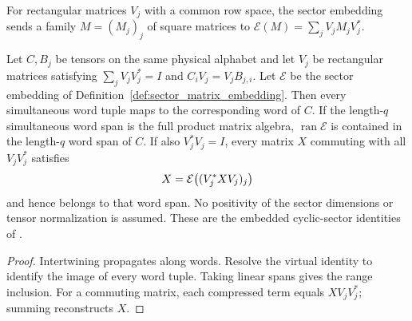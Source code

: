 \begin{definition}
    \label{def:sector_matrix_embedding}
    \leanok
    For rectangular matrices $V_j$ with a common row space, the sector
    embedding sends a family $M=(M_j)_j$ of square matrices to
    $\mathcal E(M)=\sum_jV_jM_jV_j^*$.
\end{definition}

\begin{lemma}
    \label{thm:embedded_sector_word_span}
    \leanok
    Let $C,B_j$ be tensors on the same physical alphabet and let
    $V_j$ be rectangular matrices satisfying
    $\sum_jV_jV_j^*=I$ and $C_iV_j=V_jB_{j,i}$.
    Let $\mathcal E$ be the sector embedding of
    Definition~\ref{def:sector_matrix_embedding}.
    Then every simultaneous word tuple maps to the corresponding word of $C$.
    If the length-$q$ simultaneous word span is the full product matrix algebra,
    $\operatorname{ran}\mathcal E$ is contained in the length-$q$ word span of $C$.
    If also $V_j^*V_j=I$, every matrix $X$ commuting with all
    $V_jV_j^*$ satisfies
    \begin{align}
        X=\mathcal E\bigl((V_j^*XV_j)_j\bigr)
        \notag
    \end{align}
    and hence belongs to that word span.
    No positivity of the sector dimensions or tensor normalization is assumed.
    These are the embedded cyclic-sector identities of
    \cite[Lemma~5]{DeLasCuevas2017Irreducible}.
\end{lemma}
\begin{proof}\leanok
    Intertwining propagates along words. Resolve the virtual identity to
    identify the image of every word tuple. Taking linear spans gives
    the range inclusion. For a commuting matrix, each compressed term
    equals $XV_jV_j^*$; summing reconstructs $X$.
\end{proof}

